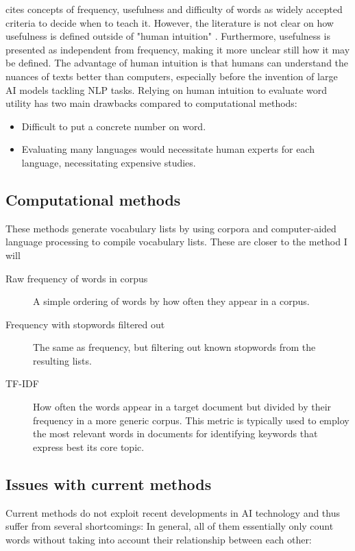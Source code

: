 \cite{heChoosingWordsTeach2019} cites concepts of frequency, usefulness and difficulty of words as widely accepted criteria to decide when to teach it.
However, the literature is not clear on how usefulness is defined outside of "human intuition" \cite{heChoosingWordsTeach2019}.
Furthermore, usefulness is presented as independent from frequency, making it more unclear still how it may be defined.
The advantage of human intuition is that humans can understand the nuances of texts better than computers, especially before the invention of large AI models tackling NLP tasks.
Relying on human intuition to evaluate word utility has two main drawbacks compared to computational methods:
\begin{itemize}
	\item Difficult to put a concrete number on word.
	\item Evaluating many languages would necessitate human experts for each language, necessitating expensive studies.
\end{itemize}

\subsection{Computational methods}
These methods generate vocabulary lists by using corpora and computer-aided language processing to compile vocabulary lists.
These are closer to the method I will

\begin{description}
	\item [Raw frequency of words in corpus]
	      A simple ordering of words by how often they appear in a corpus.
	\item [Frequency with stopwords filtered out]
	      The same as frequency, but filtering out known stopwords from the resulting lists.
	\item [TF-IDF]
	      How often the words appear in a target document but divided by their frequency in a more generic corpus.
	      This metric is typically used to employ the most relevant words in documents for identifying keywords that express best its core topic.
\end{description}

\subsection{Issues with current methods}
Current methods do not exploit recent developments in AI technology and thus suffer from several shortcomings:
In general, all of them essentially only count words without taking into account their relationship between each other:

